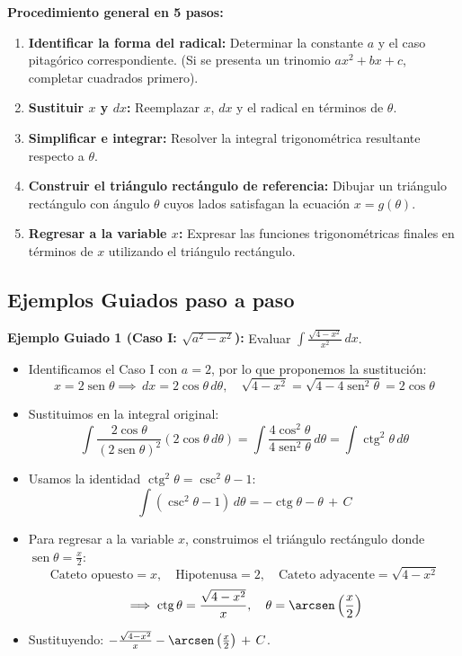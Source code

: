 \documentclass[12pt, letterpaper]{article}
\newcommand{\dx}{\,dx}
\newcommand{\dtheta}{\,d\theta}
\newcommand{\CC}{\,+\,C}
\DeclareMathOperator{\sen}{sen}
\DeclareMathOperator{\ctg}{ctg}
\begin{document}
\noindent\textbf{Procedimiento general en 5 pasos:}
\begin{enumerate}
  \item \textbf{Identificar la forma del radical:} Determinar la constante $a$ y el caso pitagórico correspondiente. (Si se presenta un trinomio $ax^2+bx+c$, completar cuadrados primero).
  \item \textbf{Sustituir $x$ y $dx$:} Reemplazar $x$, $dx$ y el radical en términos de $\theta$.
  \item \textbf{Simplificar e integrar:} Resolver la integral trigonométrica resultante respecto a $\theta$.
  \item \textbf{Construir el triángulo rectángulo de referencia:} Dibujar un triángulo rectángulo con ángulo $\theta$ cuyos lados satisfagan la ecuación $x = g(\theta)$.
  \item \textbf{Regresar a la variable $x$:} Expresar las funciones trigonométricas finales en términos de $x$ utilizando el triángulo rectángulo.
\end{enumerate}

\subsection{Ejemplos Guiados paso a paso}

\noindent\textbf{Ejemplo Guiado 1 (Caso I: $\sqrt{a^2-x^2}$):} Evaluar $\int \frac{\sqrt{4-x^2}}{x^2} \dx$.
\begin{itemize}
  \item Identificamos el Caso I con $a = 2$, por lo que proponemos la sustitución:
    $$x = 2\sen\theta \implies \dx = 2\cos\theta \dtheta, \quad \sqrt{4-x^2} = \sqrt{4 - 4\sen^2\theta} = 2\cos\theta$$
  \item Sustituimos en la integral original:
    $$\int \frac{2\cos\theta}{(2\sen\theta)^2} (2\cos\theta\dtheta) = \int \frac{4\cos^2\theta}{4\sen^2\theta} \dtheta = \int \ctg^2\theta \dtheta$$
  \item Usamos la identidad $\ctg^2\theta = \csc^2\theta - 1$:
    $$\int (\csc^2\theta - 1) \dtheta = -\ctg\theta - \theta \CC$$
  \item Para regresar a la variable $x$, construimos el triángulo rectángulo donde $\sen\theta = \frac{x}{2}$:
    $$\text{Cateto opuesto} = x, \quad \text{Hipotenusa} = 2, \quad \text{Cateto adyacente} = \sqrt{4-x^2}$$
    $$\implies \ctg\theta = \frac{\sqrt{4-x^2}}{x}, \quad \theta = \arcsen\left(\frac{x}{2}\right)$$
  \item Sustituyendo: $-\frac{\sqrt{4-x^2}}{x} - \arcsen\left(\frac{x}{2}\right) \CC$.
\end{itemize}
\end{document}
